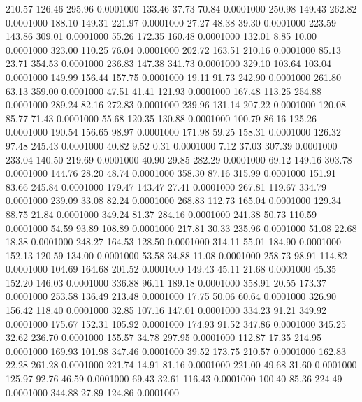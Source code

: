  210.57  126.46  295.96   0.0001000
 133.46   37.73   70.84   0.0001000
 250.98  149.43  262.82   0.0001000
 188.10  149.31  221.97   0.0001000
  27.27   48.38   39.30   0.0001000
 223.59  143.86  309.01   0.0001000
  55.26  172.35  160.48   0.0001000
 132.01    8.85   10.00   0.0001000
 323.00  110.25   76.04   0.0001000
 202.72  163.51  210.16   0.0001000
  85.13   23.71  354.53   0.0001000
 236.83  147.38  341.73   0.0001000
 329.10  103.64  103.04   0.0001000
 149.99  156.44  157.75   0.0001000
  19.11   91.73  242.90   0.0001000
 261.80   63.13  359.00   0.0001000
  47.51   41.41  121.93   0.0001000
 167.48  113.25  254.88   0.0001000
 289.24   82.16  272.83   0.0001000
 239.96  131.14  207.22   0.0001000
 120.08   85.77   71.43   0.0001000
  55.68  120.35  130.88   0.0001000
 100.79   86.16  125.26   0.0001000
 190.54  156.65   98.97   0.0001000
 171.98   59.25  158.31   0.0001000
 126.32   97.48  245.43   0.0001000
  40.82    9.52    0.31   0.0001000
   7.12   37.03  307.39   0.0001000
 233.04  140.50  219.69   0.0001000
  40.90   29.85  282.29   0.0001000
  69.12  149.16  303.78   0.0001000
 144.76   28.20   48.74   0.0001000
 358.30   87.16  315.99   0.0001000
 151.91   83.66  245.84   0.0001000
 179.47  143.47   27.41   0.0001000
 267.81  119.67  334.79   0.0001000
 239.09   33.08   82.24   0.0001000
 268.83  112.73  165.04   0.0001000
 129.34   88.75   21.84   0.0001000
 349.24   81.37  284.16   0.0001000
 241.38   50.73  110.59   0.0001000
  54.59   93.89  108.89   0.0001000
 217.81   30.33  235.96   0.0001000
  51.08   22.68   18.38   0.0001000
 248.27  164.53  128.50   0.0001000
 314.11   55.01  184.90   0.0001000
 152.13  120.59  134.00   0.0001000
  53.58   34.88   11.08   0.0001000
 258.73   98.91  114.82   0.0001000
 104.69  164.68  201.52   0.0001000
 149.43   45.11   21.68   0.0001000
  45.35  152.20  146.03   0.0001000
 336.88   96.11  189.18   0.0001000
 358.91   20.55  173.37   0.0001000
 253.58  136.49  213.48   0.0001000
  17.75   50.06   60.64   0.0001000
 326.90  156.42  118.40   0.0001000
  32.85  107.16  147.01   0.0001000
 334.23   91.21  349.92   0.0001000
 175.67  152.31  105.92   0.0001000
 174.93   91.52  347.86   0.0001000
 345.25   32.62  236.70   0.0001000
 155.57   34.78  297.95   0.0001000
 112.87   17.35  214.95   0.0001000
 169.93  101.98  347.46   0.0001000
  39.52  173.75  210.57   0.0001000
 162.83   22.28  261.28   0.0001000
 221.74   14.91   81.16   0.0001000
 221.00   49.68   31.60   0.0001000
 125.97   92.76   46.59   0.0001000
  69.43   32.61  116.43   0.0001000
 100.40   85.36  224.49   0.0001000
 344.88   27.89  124.86   0.0001000
